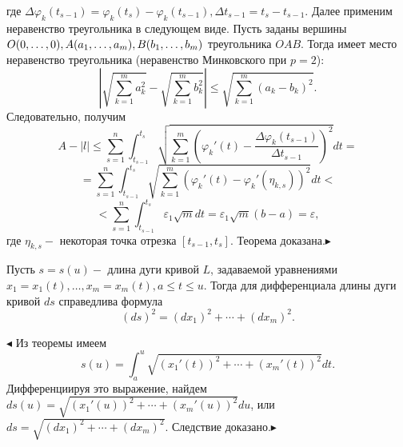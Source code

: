 где $\Delta\varphi_k(t_{s-1})=\varphi_k(t_s)-\varphi_k(t_{s-1}), \Delta t_{s-1}=t_s-t_{s-1}.$
Далее применим неравенство треугольника в следующем виде. Пусть заданы вершины $O(0,\ldots,0), A(a_1,\ldots,a_m),\\ B(b_1,\ldots,b_m)$ треугольника $OAB$. Тогда имеет место неравенство треугольника (неравенство Минковского при $p=2$):
$$\left|{\sqrt{\sum_{k=1}^m a_k^2}-\sqrt{\sum_{k=1}^m b_k^2}}\right| \le \sqrt{\sum_{k=1}^m(a_k-b_k)^2}.$$
Следовательно, получим
$$A-|l|\le\sum_{s=1}^n\int_{t_{s-1}}^{t_s} {\sqrt{\sum_{k=1}^m{\left(\varphi_k'(t) -\dfrac{\Delta \varphi_k(t_{s-1})}{\Delta t_{s-1}}\right)^2}}dt}=$$
$$=\sum_{s=1}^n\int_{t_{s-1}}^{t_s}\sqrt{\sum_{k=1}^m{\left(\varphi_k'(t) -\varphi_k'(\eta_{k,s})\right)^2}}dt<$$
$$<\sum_{s=1}^n\int_{t_{s-1}}^{t_s}{\varepsilon_1 \sqrt{m} dt }= \varepsilon_1 \sqrt{m} (b-a)=\varepsilon,$$
где $\eta_{k,s} -$ некоторая точка отрезка $[t_{s-1},t_s]$. Теорема доказана.$\blacktriangleright$

\begin{sledstvie} Пусть $s=s(u)-$ длина дуги кривой $L$, задаваемой уравнениями $x_1=x_1(t),\ldots,x_m=x_m(t), a\le t\le u$. Тогда для дифференциала длины дуги кривой $ds$ справедлива формула
$$(ds)^2=(dx_1)^2+\cdots+(dx_m)^2.$$
\end{sledstvie}
$\blacktriangleleft$ Из теоремы имеем
$$s(u)=\int_a^u{\sqrt{(x_1'(t))^2+\cdots+(x_m'(t))^2}}dt.$$
Дифференциируя это выражение, найдем
$ds(u)=\sqrt{(x_1'(u))^2+\cdots+(x_m'(u))^2}du$, или $ds=\sqrt{(dx_1)^2+\cdots+(dx_m)^2}$.
Следствие доказано.$\blacktriangleright$

